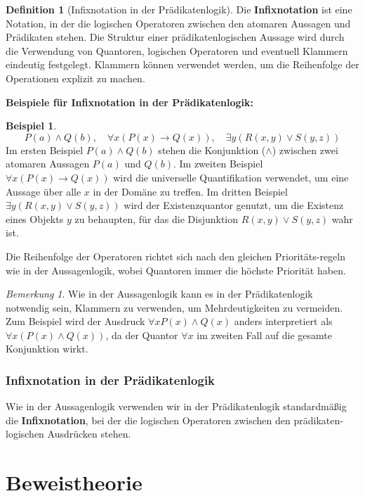 \documentclass{book}
\theoremstyle{plain}
\theoremstyle{remark}
\newtheorem*{remark}{Bemerkung}
\theoremstyle{definition}
\newtheorem{definition}{Definition}[section]
\newtheorem*{example}{Beispiel}
\begin{document}
\begin{definition}[Infixnotation in der Prädikatenlogik]
Die \textbf{Infixnotation} ist eine Notation, in der die logischen Operatoren zwischen den atomaren Aussagen und Prädikaten stehen. Die Struktur einer prädikatenlogischen Aussage wird durch die Verwendung von Quantoren, logischen Operatoren und eventuell Klammern eindeutig festgelegt. Klammern können verwendet werden, um die Reihenfolge der Operationen explizit zu machen.

\textbf{Beispiele für Infixnotation in der Prädikatenlogik:}
\begin{example}
    \[
    P(a) \land Q(b), \quad \forall x (P(x) \rightarrow Q(x)), \quad \exists y (R(x, y) \lor S(y, z))
    \]
    Im ersten Beispiel \(P(a) \land Q(b)\) stehen die Konjunktion (\(\land\)) zwischen zwei atomaren Aussagen \(P(a)\) und \(Q(b)\). Im zweiten Beispiel \(\forall x (P(x) \rightarrow Q(x))\) wird die universelle Quantifikation verwendet, um eine Aussage über alle \(x\) in der Domäne zu treffen. Im dritten Beispiel \(\exists y (R(x, y) \lor S(y, z))\) wird der Existenzquantor genutzt, um die Existenz eines Objekts \(y\) zu behaupten, für das die Disjunktion \(R(x, y) \lor S(y, z)\) wahr ist.
\end{example}

Die Reihenfolge der Operatoren richtet sich nach den gleichen Prioritäts-regeln wie in der Aussagenlogik, wobei Quantoren immer die höchste Priorität haben.
\end{definition}

\begin{remark}
Wie in der Aussagenlogik kann es in der Prädikatenlogik notwendig sein, Klammern zu verwenden, um Mehrdeutigkeiten zu vermeiden. Zum Beispiel wird der Ausdruck \(\forall x P(x) \land Q(x)\) anders interpretiert als \(\forall x (P(x) \land Q(x))\), da der Quantor \(\forall x\) im zweiten Fall auf die gesamte Konjunktion wirkt.
\end{remark}

\subsection{Infixnotation in der Prädikatenlogik}

Wie in der Aussagenlogik verwenden wir in der Prädikatenlogik standardmäßig die \textbf{Infixnotation}, bei der die logischen Operatoren zwischen den prädikaten-logischen Ausdrücken stehen.

\chapter{Beweistheorie}
\end{document}
